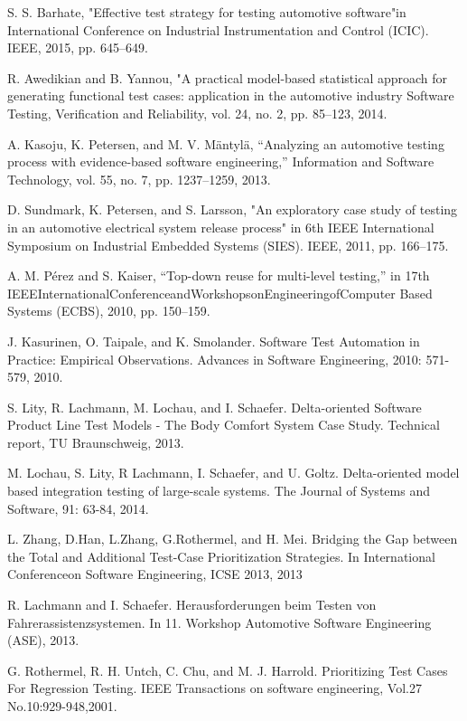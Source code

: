 \documentclass[a4paper]{article}
\begin{document}
\begin{thebibliography}{9}
S. S. Barhate, "Effective test strategy for testing automotive software"in International Conference on Industrial Instrumentation and Control (ICIC). IEEE, 2015, pp. 645–649. 

R. Awedikian and B. Yannou, "A practical model-based statistical approach for generating functional test cases: application in the automotive industry Software Testing, Verification and Reliability, vol. 24, no. 2, pp. 85–123, 2014.

A. Kasoju, K. Petersen, and M. V. Mäntylä, “Analyzing an automotive testing process with evidence-based software engineering,” Information and Software Technology, vol. 55, no. 7, pp. 1237–1259, 2013. 

D. Sundmark, K. Petersen, and S. Larsson, "An exploratory case study of testing in an automotive electrical system release process" in 6th IEEE International Symposium on Industrial Embedded Systems (SIES). IEEE, 2011, pp. 166–175. 

A. M. Pérez and S. Kaiser, “Top-down reuse for multi-level testing,” in 17th IEEEInternationalConferenceandWorkshopsonEngineeringofComputer Based Systems (ECBS), 2010, pp. 150–159. 

J. Kasurinen, O. Taipale, and K. Smolander. Software Test Automation in Practice: Empirical Observations. Advances in Software Engineering, 2010: 571-579, 2010. 

S. Lity, R. Lachmann, M. Lochau, and I. Schaefer. Delta-oriented Software Product Line Test Models - The Body Comfort System Case Study. Technical report, TU Braunschweig, 2013.

M. Lochau, S. Lity, R Lachmann, I. Schaefer, and U. Goltz. Delta-oriented model based integration testing of large-scale systems. The Journal of Systems and Software, 91: 63-84, 2014.

L. Zhang, D.Han, L.Zhang, G.Rothermel, and H. Mei. Bridging the Gap between the Total and Additional Test-Case Prioritization Strategies. In International Conferenceon Software Engineering, ICSE 2013, 2013

R. Lachmann and I. Schaefer. Herausforderungen beim Testen von Fahrerassistenzsystemen. In 11. Workshop Automotive Software Engineering (ASE), 2013.

G. Rothermel, R. H. Untch, C. Chu, and M. J. Harrold. Prioritizing Test Cases For Regression Testing. IEEE Transactions on software engineering, Vol.27 No.10:929-948,2001.


\end{thebibliography}
\end{document}
